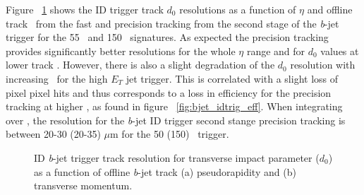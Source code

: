 	Figure ~\ref{fig:bjet_idtrig_res} shows the \ac{ID} trigger track $d_0$ resolutions as a function of $\eta$ and offline track \pt\ from the fast and precision tracking from the second stage of the \textit{b}-jet trigger for the 55 \gev\ and 150 \gev\ signatures.  As expected the precision tracking provides significantly better resolutions for the whole $\eta$ range and for $d_0$ values at lower track \pt. However, there is also a slight degradation of the $d_0$ resolution with increasing \pt\ for the high $E_T$ jet trigger. This is correlated with a slight loss of pixel pixel hits and thus corresponds to a loss in efficiency for the precision tracking at higher \pt, as found in figure ~\ref{fig:bjet_idtrig_eff}. When integrating over \pt, the resolution for the \textit{b}-jet \ac{ID} trigger second stange precision tracking is between 20-30 (20-35) $\mu$m for the 50 (150) \gev\ trigger.
	\begin{figure}[!hbt]
	\begin{center}
		\hspace{0.03\textwidth}
			\hspace{0.03\textwidth}
	\end{center}	
	\caption{\ac{ID} \textit{b}-jet trigger track resolution for transverse impact parameter ($d_0$) as a function of offline \textit{b}-jet track (a) pseudorapidity and (b) transverse momentum.}
	\label{fig:bjet_idtrig_res}
	\end{figure}	
	
